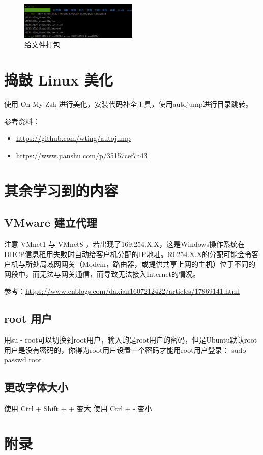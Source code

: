 \documentclass[14pt,a4paper,UTF8,twoside]{article}
\begin{document}
\begin{figure} [H]
  \centering
  \includegraphics[width=0.5\textwidth]{lec2/tar.png}
  \caption{给文件打包}
  \label{fig:11}
\end{figure}

\section{捣鼓 Linux 美化}

使用 Oh My Zsh 进行美化，安装代码补全工具，使用autojump进行目录跳转。

参考资料：

\begin{itemize}
  \item \href{https://github.com/wting/autojump}{\underline{https://github.com/wting/autojump}}
  \item \href{https://www.jianshu.com/p/35157cef7a43}{\underline{https://www.jianshu.com/p/35157cef7a43}}
\end{itemize}

\section{其余学习到的内容}

\subsection{VMware 建立代理}
注意 VMnet1 与 VMnet8 ，若出现了169.254.X.X，这是Windows操作系统在DHCP信息租用失败时自动给客户机分配的IP地址。69.254.X.X的分配可能会令客户机与所处局域网网关（Modem，路由器，或提供共享上网的主机）位于不同的网段中，而无法与网关通信，而导致无法接入Internet的情况。

参考：\href{https://www.cnblogs.com/daxian1607212422/articles/17869141.html}{\underline{https://www.cnblogs.com/daxian1607212422/articles/17869141.html}}

\subsection{root 用户}
用su - root可以切换到root用户，输入的是root用户的密码，但是Ubuntu默认root用户是没有密码的，你得为root用户设置一个密码才能用root用户登录：
sudo passwd root

\subsection{更改字体大小}
使用 Ctrl + Shift + + 变大
使用 Ctrl + - 变小

\newpage{}

\section{附录}
\end{document}
